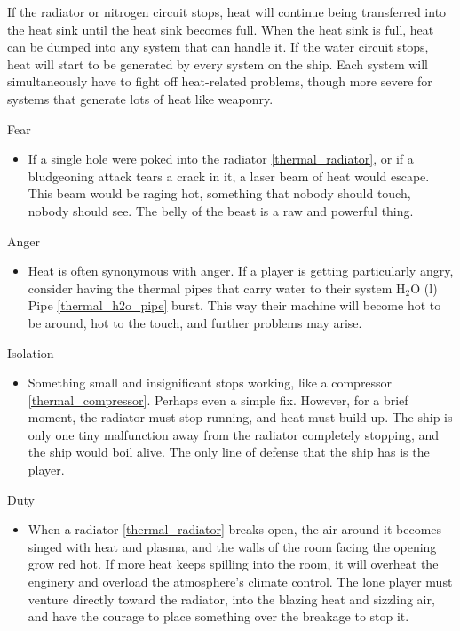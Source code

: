 \documentclass[a4paper]{article}
\begin{document}
If the radiator or nitrogen circuit stops, heat will continue being transferred into the heat sink until the heat sink becomes full. When the heat sink is full, heat can be dumped into any system that can handle it. If the water circuit stops, heat will start to be generated by every system on the ship. Each system will simultaneously have to fight off heat-related problems, though more severe for systems that generate lots of heat like weaponry.

\vspace{0.3cm}
\begin{minipage}[t]{0.4\linewidth}
Fear
\begin{itemize}
\item If a single hole were poked into the radiator \ref{thermal_radiator}, or if a bludgeoning attack tears a crack in it, a laser beam of heat would escape. This beam would be raging hot, something that nobody should touch, nobody should see. The belly of the beast is a raw and powerful thing.
\end{itemize}
\end{minipage} 
\begin{minipage}[t]{0.4\linewidth}
Anger
\begin{itemize}
\item Heat is often synonymous with anger. If a player is getting particularly angry, consider having the thermal pipes that carry water to their system H$_2$O (l) Pipe \ref{thermal_h2o_pipe} burst. This way their machine will become hot to be around, hot to the touch, and further problems may arise. 
\end{itemize}
\end{minipage}

\begin{minipage}[t]{0.4\linewidth}
Isolation
\begin{itemize}
\item Something small and insignificant stops working, like a compressor \ref{thermal_compressor}. Perhaps even a simple fix. However, for a brief moment, the radiator must stop running, and heat must build up. The ship is only one tiny malfunction away from the radiator completely stopping, and the ship would boil alive. The only line of defense that the ship has is the player.
\end{itemize}
\end{minipage}
\begin{minipage}[t]{0.4\linewidth}
Duty
\begin{itemize}
\item When a radiator \ref{thermal_radiator} breaks open, the air around it becomes singed with heat and plasma, and the walls of the room facing the opening grow red hot. If more heat keeps spilling into the room, it will overheat the enginery and overload the atmosphere's climate control. The lone player must venture directly toward the radiator, into the blazing heat and sizzling air, and have the courage to place something over the breakage to stop it.
\end{itemize}
\end{minipage}
\end{document}
